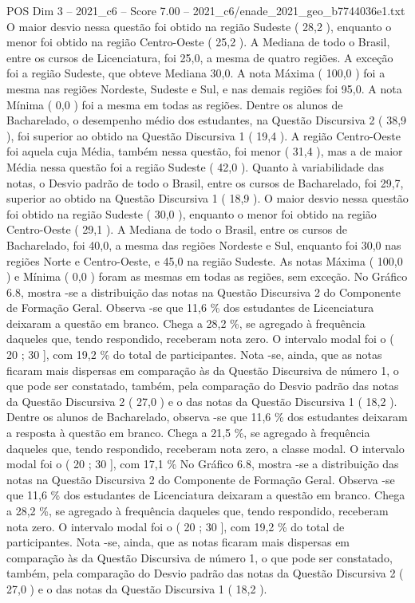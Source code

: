 \begin{textsample}{POS Dim 3 – 2021\_c6 – Score 7.00 – 2021\_c6/enade\_2021\_geo\_b7744036e1.txt}
O maior desvio nessa questão foi obtido na região Sudeste ( 28,2 ), enquanto o menor foi obtido na região Centro-Oeste ( 25,2 ).
A Mediana de todo o Brasil, entre os cursos de Licenciatura, foi 25,0, a mesma de quatro regiões.
A exceção foi a região Sudeste, que obteve Mediana 30,0.
A nota Máxima ( 100,0 ) foi a mesma nas regiões Nordeste, Sudeste e Sul, e nas demais regiões foi 95,0.
A nota Mínima ( 0,0 ) foi a mesma em todas as regiões.
Dentre os alunos de Bacharelado, o desempenho médio dos estudantes, na Questão Discursiva 2 ( 38,9 ), foi superior ao obtido na Questão Discursiva 1 ( 19,4 ).
A região Centro-Oeste foi aquela cuja Média, também nessa questão, foi menor ( 31,4 ), mas a de maior Média nessa questão foi a região Sudeste ( 42,0 ).
Quanto à variabilidade das notas, o Desvio padrão de todo o Brasil, entre os cursos de Bacharelado, foi 29,7, superior ao obtido na Questão Discursiva 1 ( 18,9 ).
O maior desvio nessa questão foi obtido na região Sudeste ( 30,0 ), enquanto o menor foi obtido na região Centro-Oeste ( 29,1 ).
A Mediana de todo o Brasil, entre os cursos de Bacharelado, foi 40,0, a mesma das regiões Nordeste e Sul, enquanto foi 30,0 nas regiões Norte e Centro-Oeste, e 45,0 na região Sudeste.
As notas Máxima ( 100,0 ) e Mínima ( 0,0 ) foram as mesmas em todas as regiões, sem exceção.
No Gráfico 6.8, mostra -se a distribuição das notas na Questão Discursiva 2 do Componente de Formação Geral.
Observa -se que 11,6 \% dos estudantes de Licenciatura deixaram a questão em branco.
Chega a 28,2 \%, se agregado à frequência daqueles que, tendo respondido, receberam nota zero.
O intervalo modal foi o ( 20 ; 30 ], com 19,2 \% do total de participantes.
Nota -se, ainda, que as notas ficaram mais dispersas em comparação às da Questão Discursiva de número 1, o que pode ser constatado, também, pela comparação do Desvio padrão das notas da Questão Discursiva 2 ( 27,0 ) e o das notas da Questão Discursiva 1 ( 18,2 ).
Dentre os alunos de Bacharelado, observa -se que 11,6 \% dos estudantes deixaram a resposta à questão em branco.
Chega a 21,5 \%, se agregado à frequência daqueles que, tendo respondido, receberam nota zero, a classe modal.
O intervalo modal foi o ( 20 ; 30 ], com 17,1 \% No Gráfico 6.8, mostra -se a distribuição das notas na Questão Discursiva 2 do Componente de Formação Geral.
Observa -se que 11,6 \% dos estudantes de Licenciatura deixaram a questão em branco.
Chega a 28,2 \%, se agregado à frequência daqueles que, tendo respondido, receberam nota zero.
O intervalo modal foi o ( 20 ; 30 ], com 19,2 \% do total de participantes.
Nota -se, ainda, que as notas ficaram mais dispersas em comparação às da Questão Discursiva de número 1, o que pode ser constatado, também, pela comparação do Desvio padrão das notas da Questão Discursiva 2 ( 27,0 ) e o das notas da Questão Discursiva 1 ( 18,2 ).

\end{textsample}
